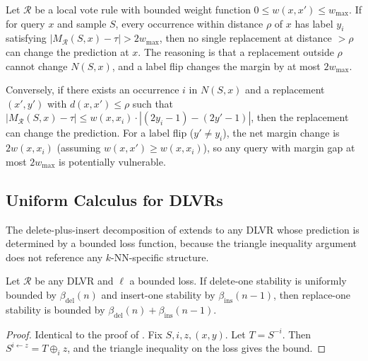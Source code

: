 \begin{remark}
\label{rem:margin-certificate}
Let $\mathcal{R}$ be a local vote rule with bounded weight function
$0 \le w(x,x') \le w_{\max}$. If for query $x$ and sample $S$,
every occurrence within distance $\rho$ of $x$ has label $y_i$ satisfying
$|M_{\mathcal{R}}(S, x) - \tau| > 2 w_{\max}$, then no single replacement at
distance $>\rho$ can change the prediction at $x$. The reasoning is that
a replacement outside $\rho$ cannot change $N(S,x)$, and a label flip changes
the margin by at most $2 w_{\max}$.
\end{remark}

\begin{remark}
\label{rem:vulnerability}
Conversely, if there exists an occurrence $i$ in $N(S,x)$ and a replacement
$(x', y')$ with $d(x, x') \le \rho$ such that
$|M_{\mathcal{R}}(S, x) - \tau| \le w(x, x_i) \cdot |(2y_i-1) - (2y'-1)|$,
then the replacement can change the prediction. For a label flip
($y' \neq y_i$), the net margin change is $2 w(x, x_i)$ (assuming
$w(x,x') \ge w(x,x_i)$), so any query with margin gap at most $2 w_{\max}$
is potentially vulnerable.
\end{remark}

\subsection{Uniform Calculus for DLVRs}

The delete-plus-insert decomposition of  extends to any DLVR
whose prediction is determined by a bounded loss function, because the
triangle inequality argument does not reference any $k$-NN-specific structure.

\begin{proposition}
\label{prop:dlvr-calculus}
Let $\mathcal{R}$ be any DLVR and $\ell$ a bounded loss. If delete-one
stability is uniformly bounded by $\beta_{\mathrm{del}}(n)$ and insert-one
stability by $\beta_{\mathrm{ins}}(n-1)$, then replace-one stability is
bounded by $\beta_{\mathrm{del}}(n) + \beta_{\mathrm{ins}}(n-1)$.
\end{proposition}

\begin{proof}
Identical to the proof of . Fix $S,i,z,(x,y)$. Let
$T = S^{-i}$. Then $S^{i\leftarrow z} = T \oplus_i z$, and the triangle
inequality on the loss gives the bound.
\end{proof}

